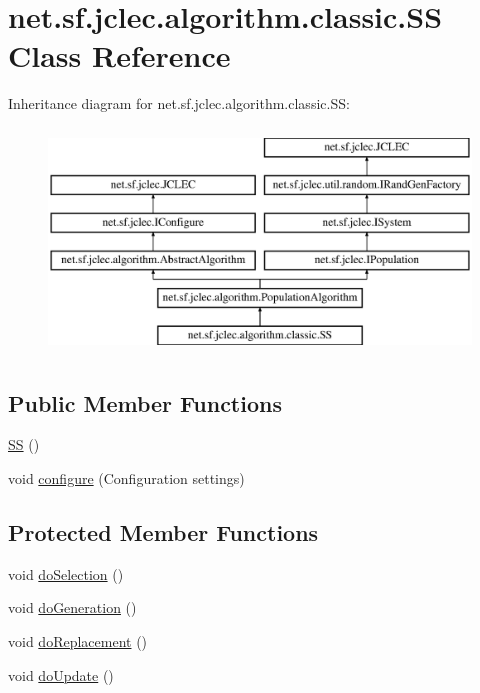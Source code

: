 \hypertarget{classnet_1_1sf_1_1jclec_1_1algorithm_1_1classic_1_1_s_s}{\section{net.\-sf.\-jclec.\-algorithm.\-classic.\-S\-S Class Reference}
\label{classnet_1_1sf_1_1jclec_1_1algorithm_1_1classic_1_1_s_s}
}
Inheritance diagram for net.\-sf.\-jclec.\-algorithm.\-classic.\-S\-S\-:\begin{figure}[H]
\begin{center}
\leavevmode
\includegraphics[height=6.000000cm]{classnet_1_1sf_1_1jclec_1_1algorithm_1_1classic_1_1_s_s}
\end{center}
\end{figure}
\subsection*{Public Member Functions}
\begin{DoxyCompactItemize}
\item 
\hyperlink{classnet_1_1sf_1_1jclec_1_1algorithm_1_1classic_1_1_s_s_a59bb4e37a66221172b99fe089cca3e32}{S\-S} ()
\item 
void \hyperlink{classnet_1_1sf_1_1jclec_1_1algorithm_1_1classic_1_1_s_s_a750a21e7d053bcd7170c15b1eff98443}{configure} (Configuration settings)
\end{DoxyCompactItemize}
\subsection*{Protected Member Functions}
\begin{DoxyCompactItemize}
\item 
void \hyperlink{classnet_1_1sf_1_1jclec_1_1algorithm_1_1classic_1_1_s_s_a17a4da3091ee68f6bdaaddd7e1b87d88}{do\-Selection} ()
\item 
void \hyperlink{classnet_1_1sf_1_1jclec_1_1algorithm_1_1classic_1_1_s_s_a7ced791d9ff0dc80a04645438a2611cb}{do\-Generation} ()
\item 
void \hyperlink{classnet_1_1sf_1_1jclec_1_1algorithm_1_1classic_1_1_s_s_ac8ec51f491f032e8cb1140ef0da43f51}{do\-Replacement} ()
\item 
void \hyperlink{classnet_1_1sf_1_1jclec_1_1algorithm_1_1classic_1_1_s_s_abb8fcd2389cc3909a55b6a33f6fe946d}{do\-Update} ()
\end{DoxyCompactItemize}
